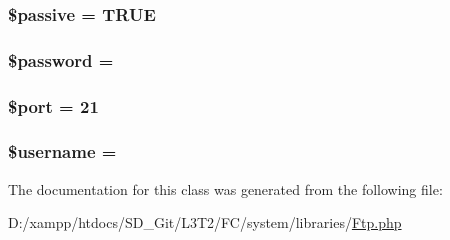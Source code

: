 \subsubsection[{\$passive}]{\setlength{\rightskip}{0pt plus 5cm}\$passive = T\+R\+U\+E}\label{class_c_i___f_t_p_a9fb61732ea9189fa2be5574ad3576d9c}
\hypertarget{class_c_i___f_t_p_a607686ef9f99ea7c42f4f3dd3dbb2b0d}{}
\subsubsection[{\$password}]{\setlength{\rightskip}{0pt plus 5cm}\$password = \textquotesingle{}\textquotesingle{}}\label{class_c_i___f_t_p_a607686ef9f99ea7c42f4f3dd3dbb2b0d}
\hypertarget{class_c_i___f_t_p_aa0787efab4b22e8a212882f3409d4c77}{}
\subsubsection[{\$port}]{\setlength{\rightskip}{0pt plus 5cm}\$port = 21}\label{class_c_i___f_t_p_aa0787efab4b22e8a212882f3409d4c77}
\hypertarget{class_c_i___f_t_p_a0eb82aa5f81cf845de4b36cd653c42cf}{}
\subsubsection[{\$username}]{\setlength{\rightskip}{0pt plus 5cm}\$username = \textquotesingle{}\textquotesingle{}}\label{class_c_i___f_t_p_a0eb82aa5f81cf845de4b36cd653c42cf}


The documentation for this class was generated from the following file\+:\begin{DoxyCompactItemize}
\item 
D\+:/xampp/htdocs/\+S\+D\+\_\+\+Git/\+L3\+T2/\+F\+C/system/libraries/\hyperlink{_ftp_8php}{Ftp.\+php}\end{DoxyCompactItemize}
